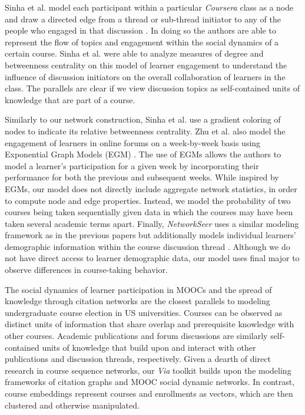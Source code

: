 Sinha et al. model each participant within a particular \textit{Coursera} class as a node and draw a directed edge from a thread or sub-thread initiator to any of the people who engaged in that discussion \cite{Sinha2014}. In doing so the authors are able to represent the flow of topics and engagement within the social dynamics of a certain course. Sinha et al. were able to analyze measures of degree and betweenness centrality on this model of learner engagement to understand the influence of discussion initiators on the overall collaboration of learners in the class. The parallels are clear if we view discussion topics as self-contained units of knowledge that are part of a course. 

Similarly to our network construction, Sinha et al. use a gradient
coloring of nodes to indicate its relative betweenness
centrality. Zhu et al. also model the engagement of
learners in online forums on a week-by-week basis using
Exponential Graph Models (EGM) \cite{Zhu2016}. The use of EGMs allows
the authors to model a learner's participation for a given week by
incorporating their performance for both the previous and
subsequent weeks. While inspired by EGMs, our model does not directly
include aggregate network statistics, in order to compute node and edge
properties. Instead, we model the probability of two courses
being taken sequentially given data in which the courses may have been
taken several academic terms apart. Finally, \textit{NetworkSeer} uses a similar modeling framework as in the previous papers but additionally models individual learners' demographic information within the course discussion thread \cite{Wu2016}. Although we do not have direct access to learner demographic data, our model uses final major to observe differences in course-taking behavior.


The social dynamics of learner participation in MOOCs and the spread
of knowledge through citation networks are the closest parallels to
modeling undergraduate course election in US universities. Courses can
be observed as distinct units of information that share overlap and
prerequisite knowledge with other courses. Academic publications and
forum discussions are similarly self-contained units of knowledge that
build upon and interact with other publications and discussion
threads, respectively. Given a dearth of direct research in course
sequence networks, our \textit{Via} toolkit builds upon the modeling
frameworks of citation graphs and MOOC social dynamic networks. In
contrast, course embeddings \cite{pard2018} represent courses and
enrollments as vectors, which are then clustered and otherwise
manipulated.

